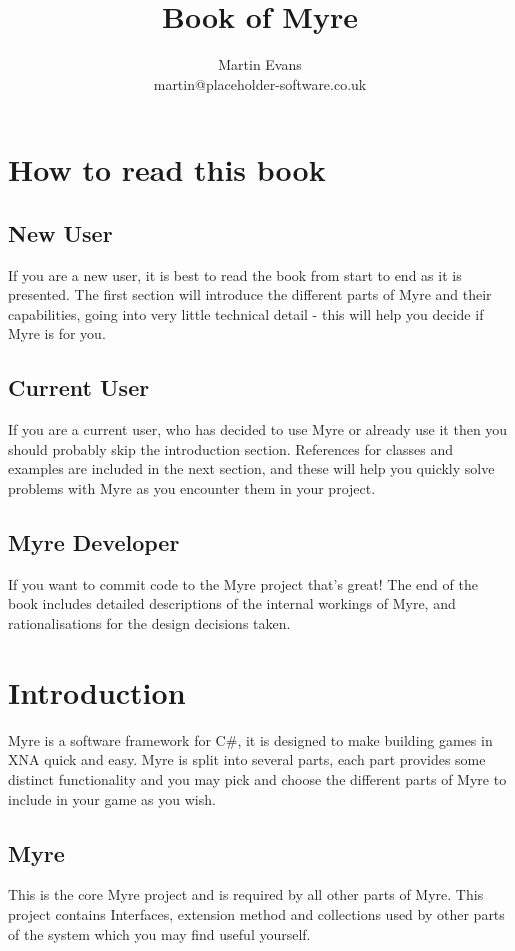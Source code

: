 \documentclass{article}
\title{Book of Myre}
\author{Martin Evans\\martin@placeholder-software.co.uk}
\date{}
\begin{document}
\maketitle

\tableofcontents
\pagebreak[4]

\section{How to read this book}
\subsection{New User}
If you are a new user, it is best to read the book from start to end as it is presented. The first section will introduce the different parts of Myre and their capabilities, going into very little technical detail - this will help you decide if Myre is for you.
\subsection{Current User}
If you are a current user, who has decided to use Myre or already use it then you should probably skip the introduction section. References for classes and examples are included in the next section, and these will help you quickly solve problems with Myre as you encounter them in your project.
\subsection{Myre Developer}
If you want to commit code to the Myre project that's great! The end of the book includes detailed descriptions of the internal workings of Myre, and rationalisations for the design decisions taken.
\pagebreak[4]

\section{Introduction}
Myre is a software framework for C\#, it is designed to make building games in XNA quick and easy. Myre is split into several parts, each part provides some distinct functionality and you may pick and choose the different parts of Myre to include in your game as you wish.
\subsection{Myre}
This is the core Myre project and is required by all other parts of Myre. This project contains Interfaces, extension method and collections used by other parts of the system which you may find useful yourself.
\end{document}
